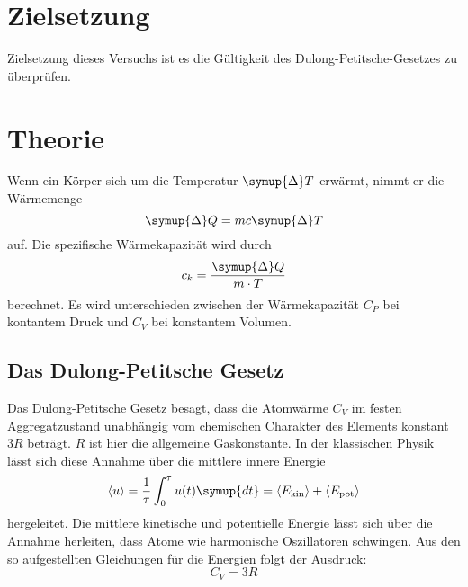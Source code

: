 \section{Zielsetzung}
Zielsetzung dieses Versuchs ist es die Gültigkeit des Dulong-Petitsche-Gesetzes zu überprüfen.
\section{Theorie}
\label{sec:Theorie}
Wenn ein Körper sich um die Temperatur $\symup{\Delta} T$ erwärmt, nimmt er die Wärmemenge
\begin{equation}
\symup{\Delta} Q = m c \symup{\Delta} T
\end{equation}
auf.
Die spezifische Wärmekapazität wird durch
\begin{equation}
c_k = \frac{\symup{\Delta} Q}{m \cdot T}
\end{equation}
berechnet.
Es wird unterschieden zwischen der Wärmekapazität $C_P$ bei kontantem Druck und $C_V$ bei konstantem Volumen.
\subsection{Das Dulong-Petitsche Gesetz}
Das Dulong-Petitsche Gesetz besagt, dass die Atomwärme $C_V$ im festen Aggregatzustand
unabhängig vom chemischen Charakter des Elements konstant $3R$ beträgt.
$R$ ist hier die allgemeine Gaskonstante.
In der klassischen Physik lässt sich diese Annahme über die mittlere innere Energie
 \begin{equation}
 \langle u \rangle = \frac{1}{\tau} \int_0^\tau u(t)\symup{dt} = \langle E_\text{kin} \rangle + \langle
E_\text{pot} \rangle
 \end{equation}
hergeleitet.
Die mittlere kinetische und potentielle Energie lässt sich über die Annahme herleiten, dass Atome
wie harmonische Oszillatoren schwingen.
Aus den so aufgestellten Gleichungen für die Energien folgt der Ausdruck:
\begin{equation}
\label{eqn:peitsche}
C_V = 3R
\end{equation}
